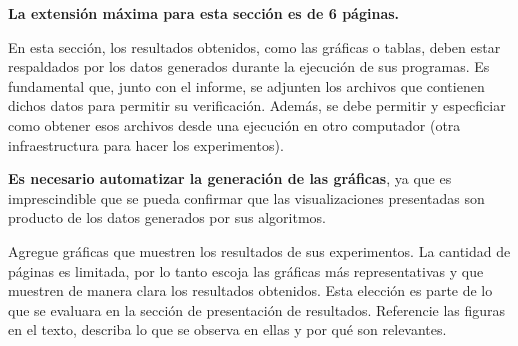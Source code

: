 \begin{mdframed}
    \textbf{La extensión máxima para esta sección es de 6 páginas.}
\end{mdframed}


En esta sección, los resultados obtenidos, como las gráficas o tablas, deben estar respaldados por los datos generados durante la ejecución de sus programas. Es fundamental que, junto con el informe, se adjunten los archivos que contienen dichos datos para permitir su verificación. Además, se debe permitir y especficiar como obtener esos archivos desde una ejecución en otro computador (otra infraestructura para hacer los experimentos).

\textbf{Es necesario automatizar la generación de las gráficas}, ya que es imprescindible que se pueda confirmar que las visualizaciones presentadas son producto de los datos generados por sus algoritmos.

Agregue gráficas que muestren los resultados de sus experimentos. La cantidad de páginas es limitada, por lo tanto escoja las gráficas más representativas y que muestren de manera clara los resultados obtenidos. Esta elección es parte de lo que se evaluara en la sección de presentación de resultados. Referencie las figuras en el texto, describa lo que se observa en ellas y por qué son relevantes.




